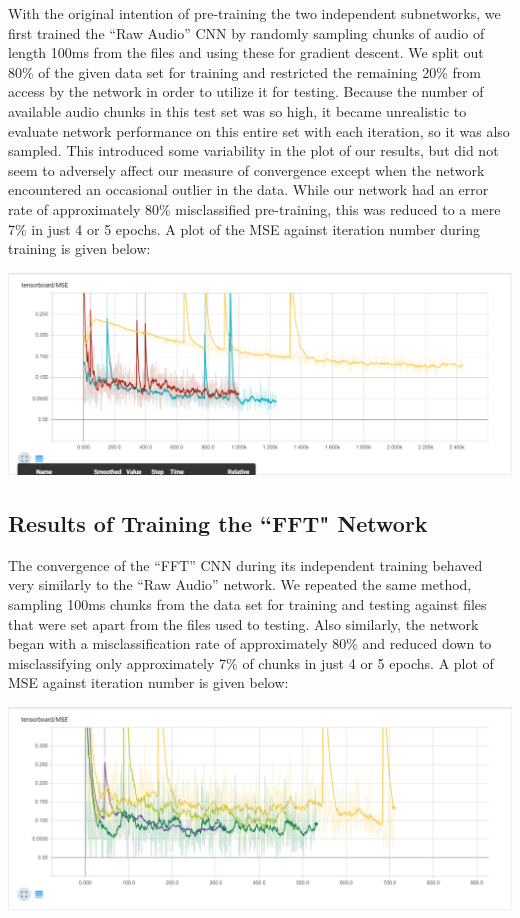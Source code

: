 \documentclass[11pt]{article}
\begin{document}
With the original intention of pre-training the two independent subnetworks, we first trained the ``Raw Audio'' CNN by randomly sampling chunks of audio of length 100ms from the files and using these for gradient descent. We split out 80\% of the given data set for training and restricted the remaining 20\% from access by the network in order to utilize it for testing. Because the number of available audio chunks in this test set was so high, it became unrealistic to evaluate network performance on this entire set with each iteration, so it was also sampled. This introduced some variability in the plot of our results, but did not seem to adversely affect our measure of convergence except when the network encountered an occasional outlier in the data. While our network had an error rate of approximately 80\% misclassified pre-training, this was reduced to a mere 7\% in just 4 or 5 epochs. A plot of the MSE against iteration number during training is given below:


\includegraphics[width=\textwidth]{Hans_Net_MSE.PNG}


\subsection{Results of Training the ``FFT" Network}

The convergence of the ``FFT'' CNN during its independent training behaved very similarly to the ``Raw Audio'' network. We repeated the same method, sampling 100ms chunks from the data set for training and testing against files that were set apart from the files used to testing. Also similarly, the network began with a misclassification rate of approximately 80\% and reduced down to misclassifying only approximately 7\% of chunks in just 4 or 5 epochs. A plot of MSE against iteration number is given below:

\includegraphics[width=\textwidth]{Tyler_Net_MSE.PNG}
\end{document}
